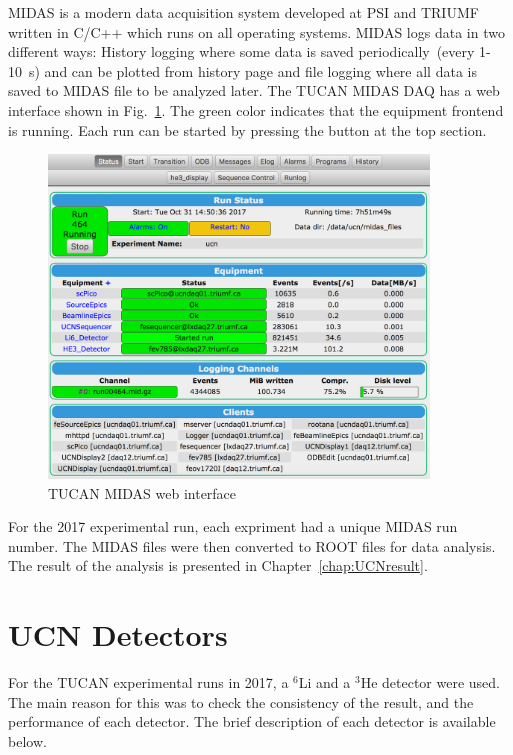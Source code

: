 MIDAS is a modern data acquisition system developed at PSI and TRIUMF
written in C/C++ which runs on all operating systems. MIDAS logs data
in two different ways: History logging where some data is saved
periodically~(every 1-10~s) and can be plotted from history page and
file logging where all data is saved to MIDAS file to be analyzed
later. The TUCAN MIDAS DAQ has a web interface shown in
Fig.~\ref{fig:midas}. The green color indicates that the equipment
frontend is running. Each run can be started by pressing the button at
the top section.

\begin{figure}[h!]
  \centering
  \includegraphics[width=0.9\textwidth]{midas.png}
  \caption{TUCAN MIDAS web interface }
  \label{fig:midas}
\end{figure}

For the 2017 experimental run, each expriment had a unique MIDAS run
number. The MIDAS files were then converted to ROOT files for data
analysis. The result of the analysis is presented in
Chapter~\ref{chap:UCNresult}.

\section{UCN Detectors\label{sec:detectors}}
For the TUCAN experimental runs in 2017, a $^6$Li and a $^3$He
detector were used. The main reason for this was to check the
consistency of the result, and the performance of each detector. The
brief description of each detector is available below.

